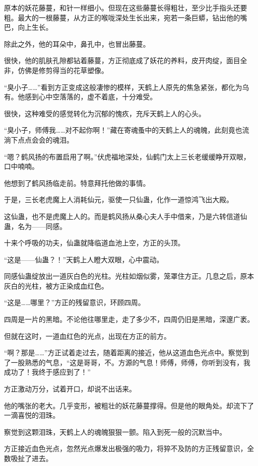 \begin{this_body}
原本的妖花藤蔓，和针一样细小。但现在这些藤蔓长得粗壮，至少比手指头还要粗。最大的一根藤蔓，从方正的喉咙深处生长出来，宛若一条巨蟒，钻出他的嘴巴，向上生长。

除此之外，他的耳朵中，鼻孔中，也冒出藤蔓。

很快，他的肌肤孔隙都钻着藤蔓，方正彻底成了妖花的养料，皮开肉绽，面目全非，仿佛是修剪得当的花草塑像。

“臭小子……”看到方正变成这般凄惨的模样，天鹤上人原先的焦急紧张，都化为乌有。他感到心中空落落的，虚不着底，十分难受。

很快，这种难受的感觉转化为沉郁的愧疚，充斥天鹤上人的心头。

“臭小子，师傅我……对不起你啊！”藏在寄魂蚤中的天鹤上人的魂魄，此刻竟也流淌下点点会会的魂泪。

“嗯？鹤风扬的布置启用了啊。”伏虎福地深处，仙鹤门太上三长老缓缓睁开双眼，口中喃喃。

他想到了鹤风扬临走前。特意拜托他做的事情。

于是，三长老虎魔上人消耗仙元，驱使一只仙蛊，化作一道惊鸿飞出大殿。

这仙蛊，也不是虎魔上人的。而是鹤风扬从桑心夫人手中借来，乃是六转信道仙蛊，名为——同感。

十来个呼吸的功夫，仙蛊就降临道血池上空，方正的头顶。

“这是——仙蛊？！”天鹤上人瞪大双眼，心中震动。

同感仙蛊绽放出一道灰白色的光柱。光柱如烟似雾，笼罩住方正。几息之后，原本灰白的光柱，被方正染成血红色。

“这是……哪里？”方正的残留意识，环顾四周。

四周是一片的黑暗。不论他往哪里走，走了多少不，四周仍旧是黑暗，深邃广袤。

但就在这时，一道血红色的光点，出现在方正的前方。

“啊？那是……”方正试着走过去，随着距离的接近，他从这道血色光点中。察觉到了一股熟悉的气息，“这是哥哥，不。方源的气息！师傅，师傅，你听到没有，我成功了！我终于感应到了！”

方正激动万分，试着开口，却说不出话来。

他的嘴张的老大。几乎变形，被粗壮的妖花藤蔓撑得。但是他的眼角处。却流下了一滴喜悦的泪珠。

察觉到这颗泪珠，天鹤上人的魂魄狠狠一颤。陷入到死一般的沉默当中。

方正接近血色光点，忽然光点爆发出极强的吸力，将猝不及防的方正残留意识，全数吸扯了进去。


\end{this_body}
